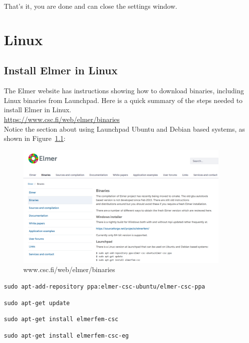 That's it, you are done and can close the settings window.


\chapter{Linux}

\section{Install Elmer in Linux}

The Elmer website has instructions showing how to download binaries, including Linux binaries from Launchpad.  Here is a quick summary of the steps needed to install Elmer in Linux.\\

 \url{https://www.csc.fi/web/elmer/binaries}\\

Notice the section about using Launchpad Ubuntu and Debian based systems, as shown in Figure~\ref{fg:binaries}:\\

\begin{figure}[H]
\begin{center}
\includegraphics[width=0.95\textwidth]{binaries}
\caption{www.csc.fi/web/elmer/binaries}\label{fg:binaries}
\end{center}
\end{figure}


\texttt{sudo apt-add-repository ppa:elmer-csc-ubuntu/elmer-csc-ppa}

\texttt{sudo apt-get update}

\texttt{sudo apt-get install elmerfem-csc}

\texttt{sudo apt-get install elmerfem-csc-eg}\\

